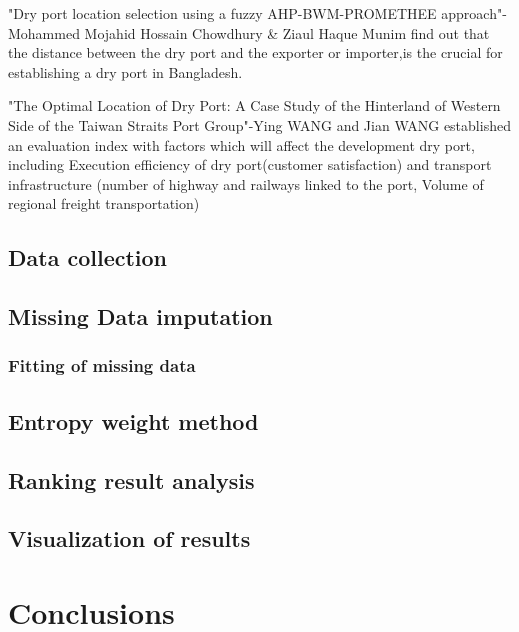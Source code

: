 \documentclass[preprint]{elsarticle}
\begin{document}
"Dry port location selection using a fuzzy AHP-BWM-PROMETHEE approach"-Mohammed Mojahid Hossain Chowdhury \& Ziaul Haque Munim find out that the distance between the dry port and the exporter or importer,is the crucial for establishing a dry port in Bangladesh.

"The Optimal Location of Dry Port: A Case Study of the Hinterland of Western Side of the Taiwan Straits Port Group"-Ying WANG and Jian WANG established an evaluation index with factors which will affect the development dry port, including Execution efficiency of dry port(customer satisfaction) and transport infrastructure (number of highway and railways linked to the port, Volume of regional freight transportation)
\subsection{Data collection}
\subsection{Missing Data imputation}
\subsubsection{Fitting of missing data }

\subsection{Entropy weight method}
 
\subsection{Ranking result analysis}
\subsection{Visualization of results}
\section{Conclusions}
\end{document}
